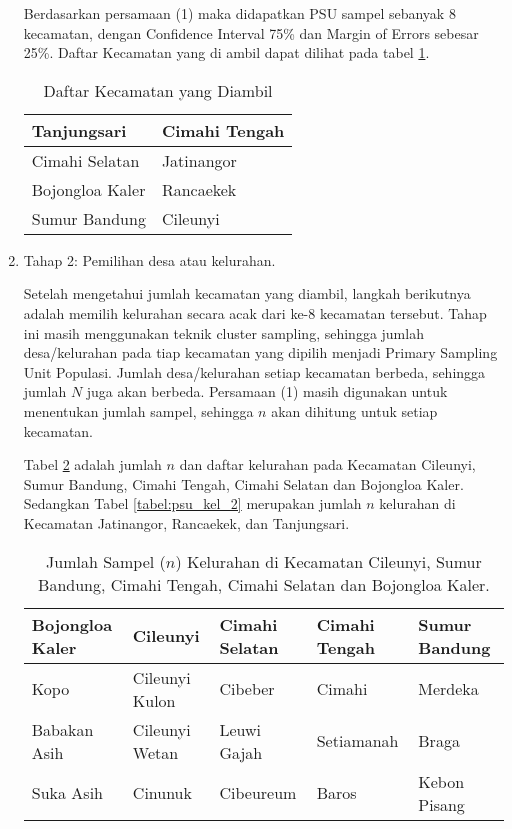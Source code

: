 \documentclass{article}
\begin{document}
\begin{enumerate}
\par\noindent
Berdasarkan persamaan (1) maka didapatkan PSU sampel sebanyak 8 kecamatan, dengan Confidence Interval 75\% dan Margin of Errors sebesar 25\%. Daftar Kecamatan yang di ambil dapat dilihat pada tabel \ref{tabel:psu_sampel}.
\begin{table}[ht]
    \centering
    \caption{Daftar Kecamatan yang Diambil}
    \label{tabel:psu_sampel}
    \begin{tabular}{|p{3cm}|p{3cm}|}
    \hline
    Tanjungsari & Cimahi Tengah  \\ \hline
    Cimahi Selatan & Jatinangor \\ \hline
    Bojongloa Kaler & Rancaekek  \\ \hline
    Sumur Bandung & Cileunyi  \\ \hline
    \end{tabular}
\end{table}
    
    \item Tahap 2: Pemilihan desa atau kelurahan. 
    
    \par\noindent
    Setelah mengetahui jumlah kecamatan yang diambil, langkah berikutnya adalah memilih kelurahan secara acak dari ke-8 kecamatan tersebut. Tahap ini masih menggunakan teknik cluster sampling, sehingga jumlah desa/kelurahan pada tiap kecamatan yang dipilih menjadi Primary Sampling Unit Populasi. Jumlah desa/kelurahan setiap kecamatan berbeda, sehingga jumlah $N$ juga akan berbeda. Persamaan (1) masih digunakan untuk menentukan jumlah sampel, sehingga $n$ akan dihitung untuk setiap kecamatan.

    Tabel \ref{tabel:psu_kel_1} adalah jumlah $n$ dan daftar kelurahan pada Kecamatan Cileunyi, Sumur Bandung, Cimahi Tengah, Cimahi Selatan dan Bojongloa Kaler. Sedangkan Tabel \ref{tabel:psu_kel_2} merupakan jumlah $n$ kelurahan di Kecamatan Jatinangor, Rancaekek, dan Tanjungsari.
    \begin{table}[ht]
        \centering
        \caption{Jumlah Sampel ($n$) Kelurahan di Kecamatan Cileunyi, Sumur Bandung, Cimahi Tengah, Cimahi Selatan dan Bojongloa Kaler.}
        \label{tabel:psu_kel_1}
        \begin{tabular}{|p{3cm}|p{2.4cm}|p{3cm}|p{3cm}|p{3cm}|}
        \hline
        \textbf{Bojongloa Kaler} & \textbf{Cileunyi} & \textbf{Cimahi Selatan} & \textbf{Cimahi Tengah} & \textbf{Sumur Bandung} \\ \hline
        Kopo & Cileunyi Kulon & Cibeber & Cimahi & Merdeka \\ \hline
        Babakan Asih & Cileunyi Wetan & Leuwi Gajah & Setiamanah & Braga \\ \hline
        Suka Asih & Cinunuk  & Cibeureum & Baros & Kebon Pisang \\ \hline
        \end{tabular}
    \end{table}


\end{enumerate}
\end{document}

